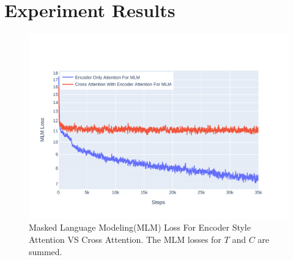 \section{Experiment Results}
\label{table_classification:experiement-result}
\begin{figure}[h]
    \centering
    \includegraphics[width=\maxwidth{\textwidth}]{src/images/mlm-loss-comparison.pdf}
    \caption{Masked Language Modeling(MLM) Loss For Encoder Style Attention VS Cross Attention. The MLM losses for $T$ and $C$ are summed. }
    \label{figure\arabic{figurecounter}}
\end{figure}

